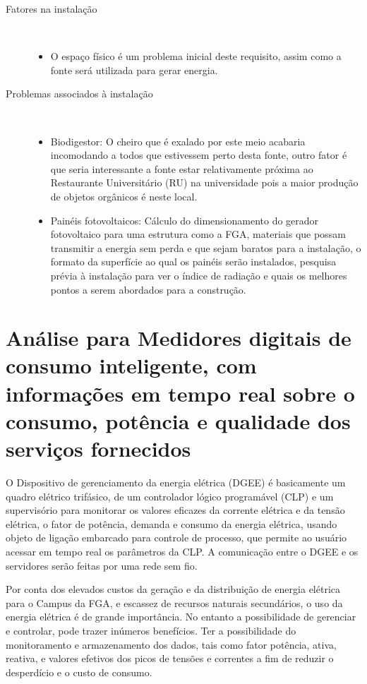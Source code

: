 \begin{description}
	\item [Fatores na instalação] \

	\begin{itemize}
	\item O espaço físico é um problema inicial deste requisito, assim como a fonte será utilizada para gerar energia.
	\end{itemize}
	\item[Problemas associados à instalação]\
	\begin{itemize}
	\item Biodigestor: O cheiro que é exalado por este meio acabaria incomodando a todos que estivessem perto desta fonte, outro fator é que seria interessante a fonte estar relativamente próxima ao Restaurante Universitário (RU) na universidade pois a maior produção de objetos orgânicos é neste local.
	\item Painéis fotovoltaicos: Cálculo do dimensionamento do gerador fotovoltaico para uma estrutura como a FGA, materiais que possam transmitir a energia sem perda e que sejam baratos para a instalação, o formato da superfície ao qual os painéis serão instalados, pesquisa prévia à instalação para ver o índice de radiação e quais os melhores pontos a serem abordados para a construção.
	\end{itemize}
\end{description}

\section{Análise para Medidores digitais de consumo inteligente, com informações em tempo real sobre o consumo, potência e qualidade dos serviços fornecidos}
O Dispositivo de gerenciamento da energia elétrica (DGEE) é basicamente um quadro elétrico trifásico, de um controlador lógico programável (CLP) e um supervisório para monitorar os valores eficazes da corrente elétrica e da tensão elétrica, o fator de potência, demanda e consumo da energia elétrica, usando objeto de ligação embarcado para controle de processo, que permite ao usuário acessar em tempo real os parâmetros da CLP. A comunicação entre o DGEE e os servidores serão feitas por uma rede sem fio.

Por conta dos elevados custos da geração e da distribuição de energia elétrica para o Campus da FGA, e escassez de recursos naturais secundários, o uso da energia elétrica é de grande importância. No entanto a possibilidade de gerenciar e controlar, pode trazer inúmeros benefícios. Ter a possibilidade do monitoramento e armazenamento dos dados, tais como fator potência, ativa, reativa, e valores efetivos dos picos de tensões e correntes a fim de reduzir o desperdício e o custo de consumo. 
 
